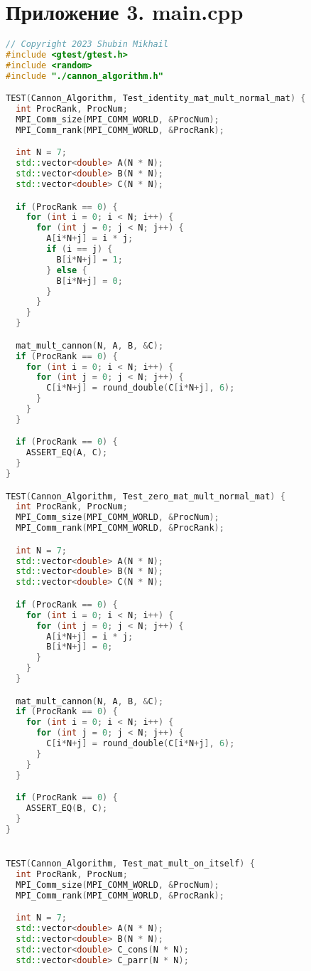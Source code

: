 \documentclass{report}
\begin{document}
\section*{Приложение 3. main.cpp}
\begin{lstlisting}[language=C++]
// Copyright 2023 Shubin Mikhail
#include <gtest/gtest.h>
#include <random>
#include "./cannon_algorithm.h"

TEST(Cannon_Algorithm, Test_identity_mat_mult_normal_mat) {
  int ProcRank, ProcNum;
  MPI_Comm_size(MPI_COMM_WORLD, &ProcNum);
  MPI_Comm_rank(MPI_COMM_WORLD, &ProcRank);

  int N = 7;
  std::vector<double> A(N * N);
  std::vector<double> B(N * N);
  std::vector<double> C(N * N);

  if (ProcRank == 0) {
    for (int i = 0; i < N; i++) {
      for (int j = 0; j < N; j++) {
        A[i*N+j] = i * j;
        if (i == j) {
          B[i*N+j] = 1;
        } else {
          B[i*N+j] = 0;
        }
      }
    }
  }

  mat_mult_cannon(N, A, B, &C);
  if (ProcRank == 0) {
    for (int i = 0; i < N; i++) {
      for (int j = 0; j < N; j++) {
        C[i*N+j] = round_double(C[i*N+j], 6);
      }
    }
  }

  if (ProcRank == 0) {
    ASSERT_EQ(A, C);
  }
}

TEST(Cannon_Algorithm, Test_zero_mat_mult_normal_mat) {
  int ProcRank, ProcNum;
  MPI_Comm_size(MPI_COMM_WORLD, &ProcNum);
  MPI_Comm_rank(MPI_COMM_WORLD, &ProcRank);

  int N = 7;
  std::vector<double> A(N * N);
  std::vector<double> B(N * N);
  std::vector<double> C(N * N);

  if (ProcRank == 0) {
    for (int i = 0; i < N; i++) {
      for (int j = 0; j < N; j++) {
        A[i*N+j] = i * j;
        B[i*N+j] = 0;
      }
    }
  }

  mat_mult_cannon(N, A, B, &C);
  if (ProcRank == 0) {
    for (int i = 0; i < N; i++) {
      for (int j = 0; j < N; j++) {
        C[i*N+j] = round_double(C[i*N+j], 6);
      }
    }
  }

  if (ProcRank == 0) {
    ASSERT_EQ(B, C);
  }
}


TEST(Cannon_Algorithm, Test_mat_mult_on_itself) {
  int ProcRank, ProcNum;
  MPI_Comm_size(MPI_COMM_WORLD, &ProcNum);
  MPI_Comm_rank(MPI_COMM_WORLD, &ProcRank);

  int N = 7;
  std::vector<double> A(N * N);
  std::vector<double> B(N * N);
  std::vector<double> C_cons(N * N);
  std::vector<double> C_parr(N * N);


\end{lstlisting}
\end{document}
